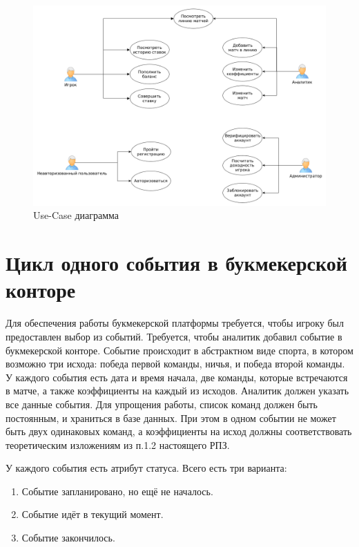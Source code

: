 \FloatBarrier
\begin{figure}[hp]	
	\begin{center}
		\includegraphics[width=\linewidth]{inc/useCase.png}
	\end{center}
	\caption{Use-Case диаграмма}
	\label{fig::UseCase}
\end{figure}
\FloatBarrier


\section{Цикл одного события в букмекерской конторе}
Для обеспечения работы букмекерской платформы требуется, чтобы игроку был предоставлен выбор из событий.
Требуется, чтобы аналитик добавил событие в букмекерской конторе. 
Событие происходит в абстрактном виде спорта, в котором возможно три исхода: победа первой команды, ничья, и победа второй команды. 
У каждого события есть дата и время начала, две команды, которые встречаются в матче, а также коэффициенты на каждый из исходов.
Аналитик должен указать все данные события. 
Для упрощения работы, список команд должен быть постоянным, и храниться в базе данных. 
При этом в одном событии не может быть двух одинаковых команд, а коэффициенты на исход должны соответствовать теоретическим изложениям из п.1.2 настоящего РПЗ.

У каждого события есть атрибут статуса. Всего есть три варианта:
\begin{enumerate}
	\item Событие запланировано, но ещё не началось.
	\item Событие идёт в текущий момент.
	\item Событие закончилось.
\end{enumerate} 

